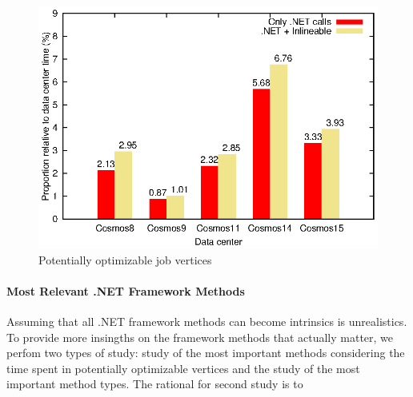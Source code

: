 \begin{figure}[ht]
\includegraphics[scale=0.8]{graphs/potentiallyOptimizable}

\caption{Potentially optimizable job vertices}
\label{fig:potentially}
\end{figure}

\paragraph{Most Relevant .NET Framework Methods}
Assuming that all .NET framework methods can become intrinsics is unrealistics. To provide more insingths on the framework methods that actually matter, we perfom two types of study: study of the most important methods considering the time spent in potentially optimizable vertices and the study of the most important method types. The rational for second study is to 


